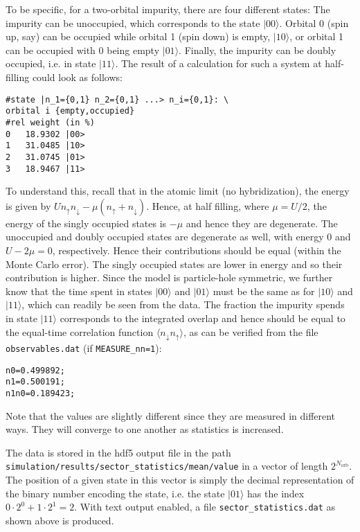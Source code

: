 \documentclass[aps,prb,floatfix,superscriptaddress,twocolumn,notitlepage]{revtex4-1}
\begin{document}
To be specific, for a two-orbital impurity, there are four different states: The impurity can be unoccupied, which corresponds to the state $|00\rangle$. Orbital 0 (spin up, say) can be occupied while orbital 1 (spin down) is empty, $|10\rangle$, or orbital 1 can be occupied with 0 being empty $|01\rangle$. Finally, the impurity can be doubly occupied, i.e. in state $|11\rangle$.
The result of a calculation for such a system at half-filling could look as follows:
\begin{verbatim}
#state |n_1={0,1} n_2={0,1} ...> n_i={0,1}: \
orbital i {empty,occupied}
#rel weight (in %)
0	18.9302	|00>
1	31.0485	|10>
2	31.0745	|01>
3	18.9467	|11>
\end{verbatim}
To understand this, recall that in the atomic limit (no hybridization), the energy is given by $Un_{\uparrow}n_{\downarrow}-\mu(n_{\uparrow}+n_{\downarrow})$. Hence, at half filling, where $\mu=U/2$, the energy of the singly occupied states is $-\mu$ and hence they are degenerate. The unoccupied and doubly occupied states are degenerate as well, with energy $0$ and $U-2\mu=0$, respectively. Hence their contributions should be equal (within the Monte Carlo error).
The singly occupied states are lower in energy and so their contribution is higher.
Since the model is particle-hole symmetric, we further know that the time spent in states $|00\rangle$ and $|01\rangle$ must be the same as for $|10\rangle$ and $|11\rangle$, which can readily be seen from the data.
The fraction the impurity spends in state $|11\rangle$ corresponds to the integrated overlap and hence should be equal to the equal-time correlation function $\langle n_{\downarrow}n_{\uparrow}\rangle$, as can be verified from the file \verb#observables.dat# (if \verb#MEASURE_nn=1#):
\begin{verbatim}
n0=0.499892;
n1=0.500191;
n1n0=0.189423;
\end{verbatim}
Note that the values are slightly different since they are measured in different ways. They will converge to one another as statistics is increased.

The data is stored in the hdf5 output file in the path \verb#simulation/results/sector_statistics/mean/value# in a vector of length $2^{N_{\text{orb}}}$.
The position of a given state in this vector is simply the decimal representation of the binary number encoding the state, i.e. the state $|01\rangle$ has the index $0\cdot 2^{0} + 1\cdot 2^{1}=2$. With text output enabled, a file \verb#sector_statistics.dat# as shown above is produced.
\end{document}
